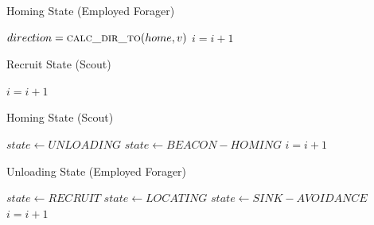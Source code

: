 \begin{algorithm}
\caption{Homing State (Employed Forager)}
\label{algorithm:employedforager:homing}
\begin{algorithmic}[1]
\State $direction = \Call{calc\_dir\_to}{home,v}$
\State {}
\EndIf
\State $i =i + 1$
\EndFunction
\end{algorithmic}
\end{algorithm}

\begin{algorithm}
\caption{Recruit State (Scout)}
\label{algorithm:recruit}
\begin{algorithmic}[1]
	\State {} 
\Else 
	\Else
	\EndIf
\EndIf
\State $i =i + 1$
\EndFunction
\end{algorithmic}
\end{algorithm}

\begin{algorithm}
\caption{Homing State (Scout)}
\label{algorithm:scout:homing}
\begin{algorithmic}[1]
	
\EndIf
{}
	\State {}
		\State $state \gets UNLOADING$
	\Else
		\State $state \gets BEACON-HOMING$	
	\EndIf
\EndIf
\State $i =i + 1$
\EndFunction
\end{algorithmic}
\end{algorithm}

\begin{algorithm}
\caption{Unloading State (Employed Forager)}
\label{algorithm:employedforager:unloading}
\begin{algorithmic}[1]
		\State {}
		\If{$\mu > \phi$}
			\State $state \gets RECRUIT$
		\Else
			\State $state \gets LOCATING$
		\EndIf
	\Else
		\State $state \gets SINK-AVOIDANCE$ 
	\EndIf
	\State $i =i + 1$
\EndFunction

\end{algorithmic}
\end{algorithm}

